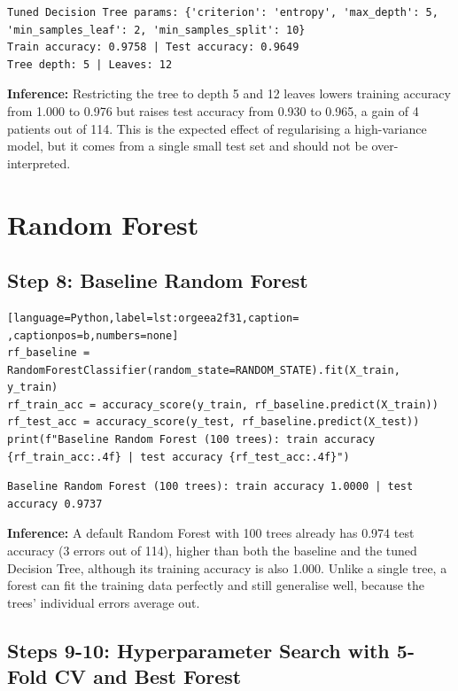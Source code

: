 \documentclass[11pt]{article}
\begin{document}
\begin{verbatim}
Tuned Decision Tree params: {'criterion': 'entropy', 'max_depth': 5, 'min_samples_leaf': 2, 'min_samples_split': 10}
Train accuracy: 0.9758 | Test accuracy: 0.9649
Tree depth: 5 | Leaves: 12
\end{verbatim}


\textbf{Inference:} Restricting the tree to depth 5 and 12 leaves lowers training accuracy from 1.000 to 0.976
but raises test accuracy from 0.930 to 0.965, a gain of 4 patients out of 114. This is the
expected effect of regularising a high-variance model, but it comes from a single small test
set and should not be over-interpreted.

\section*{Random Forest}
\label{sec:org64a23cb}


\subsection*{Step 8: Baseline Random Forest}
\label{sec:orgf2e12eb}

\begin{lstlisting}[language=Python,label=lst:orgeea2f31,caption= ,captionpos=b,numbers=none]
rf_baseline = RandomForestClassifier(random_state=RANDOM_STATE).fit(X_train, y_train)
rf_train_acc = accuracy_score(y_train, rf_baseline.predict(X_train))
rf_test_acc = accuracy_score(y_test, rf_baseline.predict(X_test))
print(f"Baseline Random Forest (100 trees): train accuracy {rf_train_acc:.4f} | test accuracy {rf_test_acc:.4f}")
\end{lstlisting}

\begin{verbatim}
Baseline Random Forest (100 trees): train accuracy 1.0000 | test accuracy 0.9737
\end{verbatim}


\textbf{Inference:} A default Random Forest with 100 trees already has 0.974 test accuracy (3 errors out of
114), higher than both the baseline and the tuned Decision Tree, although its training
accuracy is also 1.000. Unlike a single tree, a forest can fit the training data perfectly
and still generalise well, because the trees' individual errors average out.

\subsection*{Steps 9-10: Hyperparameter Search with 5-Fold CV and Best Forest}
\label{sec:orgb36d6f2}
\end{document}
